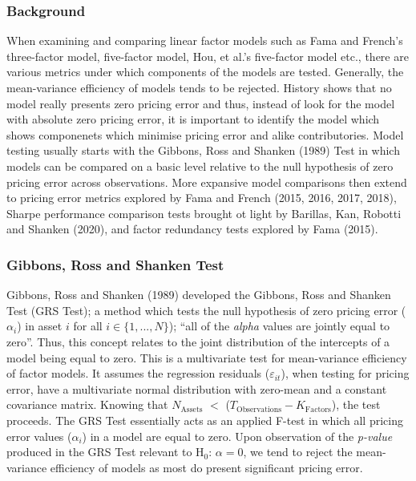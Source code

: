 \documentclass[11pt, english]{article}
\begin{document}
		\subsubsection*{Background}

        When examining and comparing linear factor models such as Fama and French's three-factor model, five-factor model, Hou, et al.'s five-factor model etc., there are various metrics under which components of the models are tested. Generally, the mean-variance efficiency of models tends to be rejected. History shows that no model really presents zero pricing error and thus, instead of look for the model with absolute zero pricing error, it is important to identify the model which shows componenets which minimise pricing error and alike contributories. Model testing usually starts with the Gibbons, Ross and Shanken (1989) Test in which models can be compared on a basic level relative to the null hypothesis of zero pricing error across observations. More expansive model comparisons then extend to pricing error metrics explored by Fama and French (2015, 2016, 2017, 2018), Sharpe performance comparison tests brought ot light by Barillas, Kan, Robotti and Shanken (2020), and factor redundancy tests explored by Fama (2015).

                \subsubsection*{Gibbons, Ross and Shanken Test}

        Gibbons, Ross and Shanken (1989) developed the Gibbons, Ross and Shanken Test (GRS Test); a method which tests the null hypothesis of zero pricing error ($\alpha_i$) in asset $i$ for all $i\in\{1,...,N\}$); ``all of the \textit{alpha} values are jointly equal to zero''. Thus, this concept relates to the joint distribution of the intercepts of a model being equal to zero. This is a multivariate test for mean-variance efficiency of factor models. It assumes the regression residuals ($\varepsilon_{it}$), when testing for pricing error, have a multivariate normal distribution with zero-mean and a constant covariance matrix. Knowing that $N\mathrm{_{Assets}}$ $<$ ($T\mathrm{_{Observations}}-K\mathrm{_{Factors}}$), the test proceeds. The GRS Test essentially acts as an applied F-test in which all pricing error values ($\alpha_i$) in a model are equal to zero. Upon observation of the \textit{p-value} produced in the GRS Test relevant to H$_0$: $\alpha=0$, we tend to reject the mean-variance efficiency of models as most do present significant pricing error.\\
\end{document}
